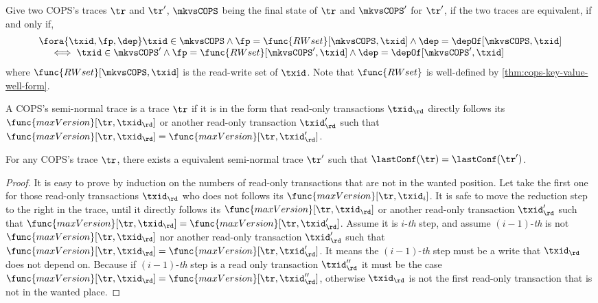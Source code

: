 Give two COPS's traces \( \tr \) and \( \tr' \), \( \mkvsCOPS \) being the final state of \( \tr \) and \( \mkvsCOPS' \) for \(\tr'\),
if the two traces are equivalent, if and only if,
\[ 
    \begin{array}{@{}l@{}}
    \fora{\txid,\fp,\dep} \txid \in \mkvsCOPS
    \land \fp = \func{RWset}[\mkvsCOPS,\txid] \land \dep =  \depOf[\mkvsCOPS,\txid] \\
    \quad {} \iff
    \txid \in \mkvsCOPS'
    \land \fp = \func{RWset}[\mkvsCOPS',\txid] \land \dep =  \depOf[\mkvsCOPS',\txid] \\
    \end{array}
\]
where \( \func{RWset}[\mkvsCOPS,\txid] \) is the read-write set of \( \txid \).
Note that \( \func{RWset} \) is well-defined by \cref{thm:cops-key-value-well-form}.

A COPS's semi-normal trace is a trace \( \tr \) if it is in the form that
read-only transactions \( \txid_\rd \) directly follows its \( \func{maxVersion}[\tr, \txid_\rd] \) or another read-only transaction \( \txid_{\rd}' \) such that \( \func{maxVersion}[\tr, \txid_\rd]  =  \func{maxVersion}[\tr, \txid_{\rd}']\).


\begin{corollary}
    \label{lem:cops-semi-normal-trace}
    \label{cor:cops-semi-normal-trace}
    For any COPS's trace \( \tr \), there exists a equivalent semi-normal trace \( \tr' \) 
    such that \( \lastConf(\tr) = \lastConf(\tr') \).
\end{corollary}
\begin{proof}
    It is easy to prove by induction on the numbers of read-only transactions that are not in the wanted position.
    Let take the first one for those read-only transactions \( \txid_\rd \) who does not follows its \( \func{maxVersion}[\tr, \txid_i] \).
    It is safe to move the reduction step to the right in the trace,
    until it directly follows its \( \func{maxVersion}[\tr, \txid_\rd] \) or another read-only transaction \( \txid_{\rd}' \) such that \( \func{maxVersion}[\tr, \txid_\rd] = \func{maxVersion}[\tr, \txid_{\rd}']\). 
    Assume it is \(i\)-\emph{th} step, and assume  \( (i-1)\)-\emph{th} is not  \( \func{maxVersion}[\tr, \txid_\rd] \) nor another read-only transaction \( \txid_{\rd}' \) such that \( \func{maxVersion}[\tr, \txid_\rd] = \func{maxVersion}[\tr, \txid_{\rd}']\).
    It means the \( (i-1)\)-\emph{th} step must be a write that \( \txid_\rd \) does not depend on.
    Because if \( (i-1)\)-\emph{th} step is a read only transaction \( \txid''_\rd \) 
    it must be the case 
    \( \func{maxVersion}[\tr, \txid_\rd] = \func{maxVersion}[\tr, \txid_{\rd}'']\), 
    otherwise \( \txid_\rd \) is not the first read-only transaction that is not in the wanted place.
\end{proof}

